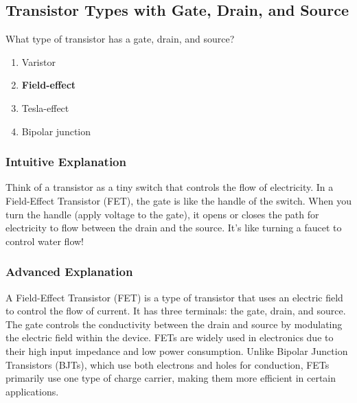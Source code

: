 \subsection{Transistor Types with Gate, Drain, and Source}
\label{T6B05}

\begin{tcolorbox}[colback=gray!10!white,colframe=black!75!black,title=T6B05]
What type of transistor has a gate, drain, and source?
\begin{enumerate}[noitemsep]
    \item Varistor
    \item \textbf{Field-effect}
    \item Tesla-effect
    \item Bipolar junction
\end{enumerate}
\end{tcolorbox}

\subsubsection*{Intuitive Explanation}
Think of a transistor as a tiny switch that controls the flow of electricity. In a Field-Effect Transistor (FET), the gate is like the handle of the switch. When you turn the handle (apply voltage to the gate), it opens or closes the path for electricity to flow between the drain and the source. It's like turning a faucet to control water flow!

\subsubsection*{Advanced Explanation}
A Field-Effect Transistor (FET) is a type of transistor that uses an electric field to control the flow of current. It has three terminals: the gate, drain, and source. The gate controls the conductivity between the drain and source by modulating the electric field within the device. FETs are widely used in electronics due to their high input impedance and low power consumption. Unlike Bipolar Junction Transistors (BJTs), which use both electrons and holes for conduction, FETs primarily use one type of charge carrier, making them more efficient in certain applications.